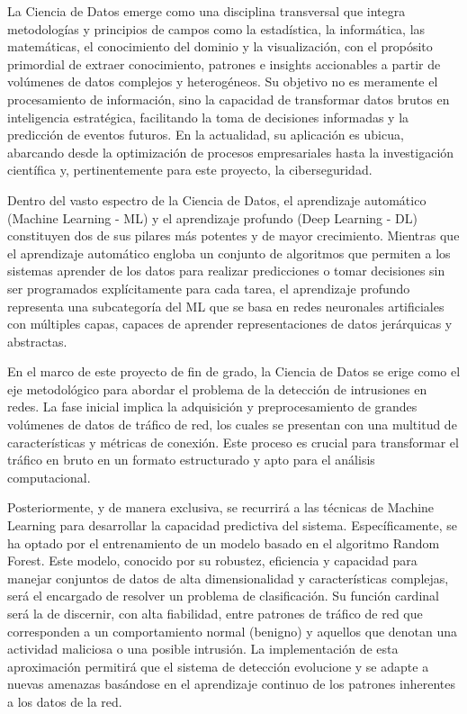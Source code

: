 La Ciencia de Datos emerge como una disciplina transversal que integra metodologías y principios de campos como la estadística, la informática, las matemáticas, el conocimiento del dominio y la visualización, con el propósito primordial de extraer conocimiento, patrones e insights accionables a partir de volúmenes de datos complejos y heterogéneos. Su objetivo no es meramente el procesamiento de información, sino la capacidad de transformar datos brutos en inteligencia estratégica, facilitando la toma de decisiones informadas y la predicción de eventos futuros. En la actualidad, su aplicación es ubicua, abarcando desde la optimización de procesos empresariales hasta la investigación científica y, pertinentemente para este proyecto, la ciberseguridad.

Dentro del vasto espectro de la Ciencia de Datos, el aprendizaje automático (Machine Learning - ML) y el aprendizaje profundo (Deep Learning - DL) constituyen dos de sus pilares más potentes y de mayor crecimiento. Mientras que el aprendizaje automático engloba un conjunto de algoritmos que permiten a los sistemas aprender de los datos para realizar predicciones o tomar decisiones sin ser programados explícitamente para cada tarea, el aprendizaje profundo representa una subcategoría del ML que se basa en redes neuronales artificiales con múltiples capas, capaces de aprender representaciones de datos jerárquicas y abstractas.

En el marco de este proyecto de fin de grado, la Ciencia de Datos se erige como el eje metodológico para abordar el problema de la detección de intrusiones en redes. La fase inicial implica la adquisición y preprocesamiento de grandes volúmenes de datos de tráfico de red, los cuales se presentan con una multitud de características y métricas de conexión. Este proceso es crucial para transformar el tráfico en bruto en un formato estructurado y apto para el análisis computacional.

Posteriormente, y de manera exclusiva, se recurrirá a las técnicas de Machine Learning para desarrollar la capacidad predictiva del sistema. Específicamente, se ha optado por el entrenamiento de un modelo basado en el algoritmo Random Forest. Este modelo, conocido por su robustez, eficiencia y capacidad para manejar conjuntos de datos de alta dimensionalidad y características complejas, será el encargado de resolver un problema de clasificación. Su función cardinal será la de discernir, con alta fiabilidad, entre patrones de tráfico de red que corresponden a un comportamiento normal (benigno) y aquellos que denotan una actividad maliciosa o una posible intrusión. La implementación de esta aproximación permitirá que el sistema de detección evolucione y se adapte a nuevas amenazas basándose en el aprendizaje continuo de los patrones inherentes a los datos de la red.

